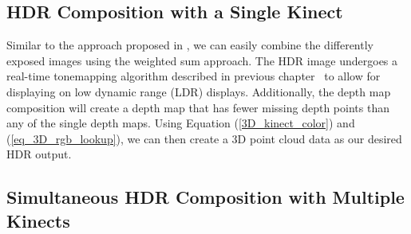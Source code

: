 \subsection{HDR Composition with a Single Kinect}
\label{sec_single_kinect}
Similar to the approach proposed in \cite{lo2012high}, we can easily combine the differently exposed images using the weighted sum approach. The HDR image undergoes a real-time tonemapping algorithm described in previous chapter~\cite{lo2012high} to allow for displaying on low dynamic range (LDR) displays. Additionally, the depth map composition will create a depth map that has fewer missing depth points than any of the single depth maps. Using Equation (\ref{3D_kinect_color}) and (\ref{eq_3D_rgb_lookup}), we can then create a 3D point cloud data as our desired HDR output. 

\subsection{Simultaneous HDR Composition with Multiple Kinects}
